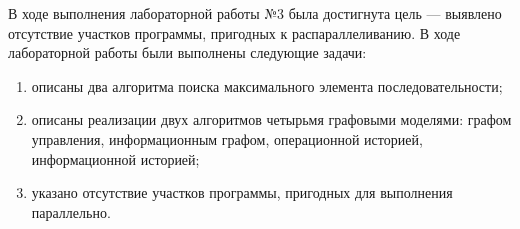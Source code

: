 
В ходе выполнения лабораторной работы №3 была достигнута цель --- выявлено отсутствие участков программы, пригодных к распараллеливанию. В ходе лабораторной работы были выполнены следующие задачи:
\begin{enumerate}
	\item описаны два алгоритма поиска максимального элемента последовательности;
\item описаны реализации двух алгоритмов четырьмя графовыми моделями: графом управления, информационным графом, операционной историей, информационной историей;
\item указано отсутствие участков программы, пригодных для выполнения параллельно.
\end{enumerate}